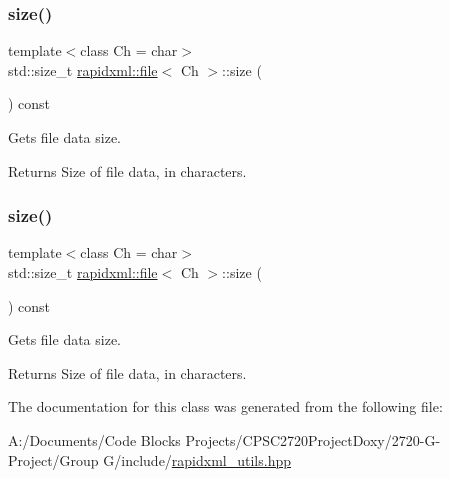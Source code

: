 \subsubsection{\texorpdfstring{size()}{size()}\hspace{0.1cm}{\footnotesize\ttfamily [1/2]}}
{\footnotesize\ttfamily template$<$class Ch  = char$>$ \\
std\+::size\+\_\+t \mbox{\hyperlink{classrapidxml_1_1file}{rapidxml\+::file}}$<$ Ch $>$\+::size (\begin{DoxyParamCaption}{ }\end{DoxyParamCaption}) const\hspace{0.3cm}{\ttfamily [inline]}}

Gets file data size. \begin{DoxyReturn}{Returns}
Size of file data, in characters. 
\end{DoxyReturn}
\mbox{\label{classrapidxml_1_1file_aacd451b3def3ad056fe8342dccee35cd}} 
\subsubsection{\texorpdfstring{size()}{size()}\hspace{0.1cm}{\footnotesize\ttfamily [2/2]}}
{\footnotesize\ttfamily template$<$class Ch  = char$>$ \\
std\+::size\+\_\+t \mbox{\hyperlink{classrapidxml_1_1file}{rapidxml\+::file}}$<$ Ch $>$\+::size (\begin{DoxyParamCaption}{ }\end{DoxyParamCaption}) const\hspace{0.3cm}{\ttfamily [inline]}}

Gets file data size. \begin{DoxyReturn}{Returns}
Size of file data, in characters. 
\end{DoxyReturn}


The documentation for this class was generated from the following file\+:\begin{DoxyCompactItemize}
\item 
A\+:/\+Documents/\+Code Blocks Projects/\+C\+P\+S\+C2720\+Project\+Doxy/2720-\/\+G-\/\+Project/\+Group G/include/\mbox{\hyperlink{include_2rapidxml__utils_8hpp}{rapidxml\+\_\+utils.\+hpp}}\end{DoxyCompactItemize}
